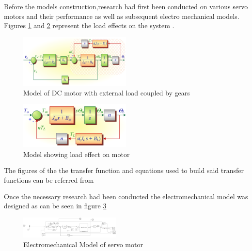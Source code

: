 Before the models construction,research had first been conducted on various servo motors and their performance as well as subsequent electro mechanical models. Figures \ref{fig:Model of DC motor with external load coupled by gears} and \ref{fig:Model Showing Load Effect on motor} represent the load effects on the system .\\

\begin{figure}[h]
 \centering
   \includegraphics[width = 0.5\textwidth]{figures/5.png}                \caption{Model of DC motor with external load coupled by gears}
   \label{fig:Model of DC motor with external load coupled by gears}
\end{figure}

\begin{figure}[h]
 \centering
   \includegraphics[width = 0.5\textwidth]{figures/6.png}                \caption{Model showing load effect on motor}
   \label{fig:Model Showing Load Effect on motor}
\end{figure}
 The figures of the the transfer function and equations used to build said transfer functions can be referred from   \cite{article}
 




Once the necessary research had been conducted the electromechanical model was designed as can be seen in figure \ref{fig:Electromechanical Model}


\begin{figure}[H]
 \centering
   \includegraphics[width = 0.45\textwidth]{figures/7.png}  \caption{Electromechanical Model of servo motor}
   \label{fig:Electromechanical Model}
\end{figure}

